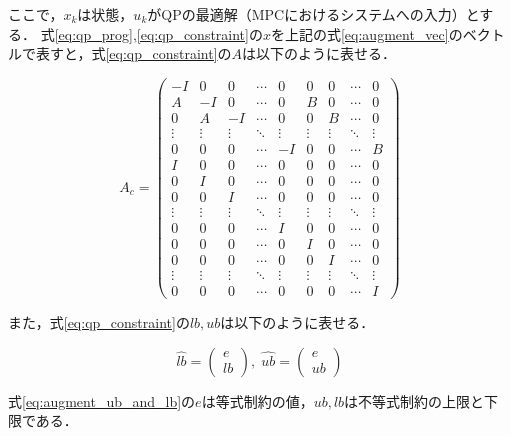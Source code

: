 ここで，$x_{k}$は状態，$u_{k}$がQPの最適解（MPCにおけるシステムへの入力）とする．
式\eqref{eq:qp_prog},\eqref{eq:qp_constraint}の$x$を上記の式\eqref{eq:augment_vec}のベクトルで表すと，式\eqref{eq:qp_constraint}の$A$は以下のように表せる．

\begin{equation}
  A_{c} =
  \left(
  \begin{array}{ccccc|cccc}
      -I & 0 & 0 & \cdots & 0 & 0 & 0 & \cdots & 0 \\ A & -I & 0 & \cdots & 0 & B & 0 & \cdots & 0 \\ 0 & A & -I & \cdots & 0 & 0 & B & \cdots & 0\\ \vdots & \vdots & \vdots & \ddots & \vdots & \vdots & \vdots & \ddots & \vdots \\ 0 & 0 & 0 & \cdots & -I & 0 & 0 & \cdots & B\\ \hline I & 0 & 0 & \cdots & 0 & 0 & 0 & \cdots & 0\\ 0 & I & 0 & \cdots & 0 & 0 & 0 & \cdots & 0\\ 0 & 0 & I & \cdots & 0 & 0 & 0 & \cdots & 0\\ \vdots & \vdots & \vdots & \ddots & \vdots & \vdots & \vdots & \ddots & \vdots \\ 0 & 0 & 0 & \cdots & I & 0 & 0 & \cdots & 0\\ 0 & 0 & 0 & \cdots & 0 & I & 0 & \cdots & 0\\ 0 & 0 & 0 & \cdots & 0 & 0 & I & \cdots & 0\\ \vdots & \vdots & \vdots & \ddots & \vdots & \vdots & \vdots & \ddots & \vdots \\ 0 & 0 & 0 & \cdots & 0 & 0 & 0 & \cdots & I
    \end{array}
  \right)
  \label{eq:mpc_constraint_matrix}
\end{equation}

また，式\eqref{eq:qp_constraint}の$lb,ub$は以下のように表せる．

\begin{equation}
  \hat{lb} =
  \begin{pmatrix}
    e \\
    lb
  \end{pmatrix},\;
  \hat{ub} =
  \begin{pmatrix}
    e \\
    ub
  \end{pmatrix}
  \label{eq:augment_ub_and_lb}
\end{equation}

式\eqref{eq:augment_ub_and_lb}の$e$は等式制約の値，$ub,lb$は不等式制約の上限と下限である．


